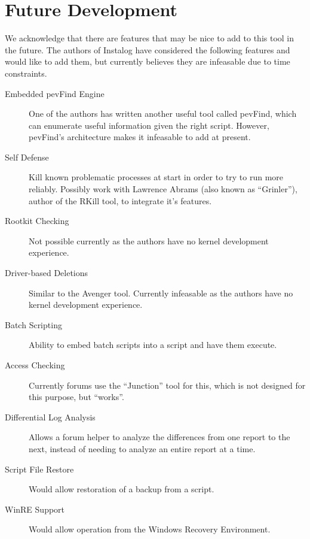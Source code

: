 \section{Future Development}
We acknowledge that there are features that may be nice to add to this tool in
the future. The authors of Instalog have considered the following features and
would like to add them, but currently believes they are infeasable due to time
constraints.
\begin{description}
\item[Embedded pevFind Engine] One of the authors has written another useful
tool called pevFind, which can enumerate useful information given the right
script. However, pevFind's architecture makes it infeasable to add at present.
\item[Self Defense] Kill known problematic processes at start in order to try to
run more reliably. Possibly work with Lawrence Abrams (also known as
``Grinler''), author of the RKill tool, to integrate it's features.
\item[Rootkit Checking] Not possible currently as the authors have no kernel
development experience.
\item[Driver-based Deletions] Similar to the Avenger tool. Currently infeasable
as the authors have no kernel development experience.
\item[Batch Scripting] Ability to embed batch scripts into a script and have
them execute.
\item[Access Checking] Currently forums use the ``Junction'' tool for this,
which is not designed for this purpose, but ``works''.
\item[Differential Log Analysis] Allows a forum helper to analyze the
differences from one report to the next, instead of needing to analyze an entire
report at a time.
\item[Script File Restore] Would allow restoration of a backup from a script.
\item[WinRE Support] Would allow operation from the Windows Recovery
Environment.
\end{description}
